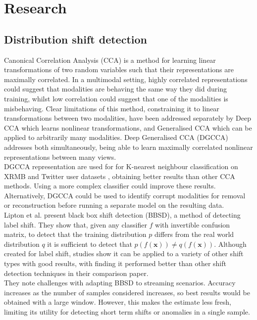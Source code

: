 \chapter{Research}

\section{Distribution shift detection}
Canonical Correlation Analysis (CCA) \cite{CCA} is a method for learning linear transformations of two random variables such that their representations are maximally correlated. In a multimodal setting, highly correlated representations could suggest that modalities are behaving the same way they did during training, whilst low correlation could suggest that one of the modalities is misbehaving. Clear limitations of this method, constraining it to linear transformations between two modalities, have been addressed separately by Deep CCA \cite{DCCA} which learns nonlinear transformations, and Generalised CCA \cite{GCCA} which can be applied to arbitrarily many modalities. Deep Generalised CCA (DGCCA) \cite{DGCCA} addresses both simultaneously, being able to learn maximally correlated nonlinear representations between many views.\\

DGCCA representation are used for for K-nearest neighbour classification on XRMB and Twitter user datasets \cite{DGCCA}, obtaining better results than other CCA methods. Using a more complex classifier could improve these results. Alternatively, DGCCA could be used to identify corrupt modalities for removal or reconstruction before running a separate model on the resulting data.\\

Lipton et al. \cite{BBSD} present black box shift detection (BBSD), a method of detecting label shift. They show that, given any classifier $f$ with invertible confusion matrix, to detect that the training distribution $p$ differs from the real world distribution $q$ it is sufficient to detect that $p(f(\boldsymbol{x}))\neq q(f(\boldsymbol{x}))$. Although created for label shift, studies show it can be applied to a variety of other shift types with good results, with \cite{failingloudly} finding it performed better than other shift detection techniques in their comparison paper.\\

They note challenges with adapting BBSD to streaming scenarios. Accuracy increases as the number of samples considered increases, so best results would be obtained with a large window. However, this makes the estimate less fresh, limiting its utility for detecting short term shifts or anomalies in a single sample.\\

